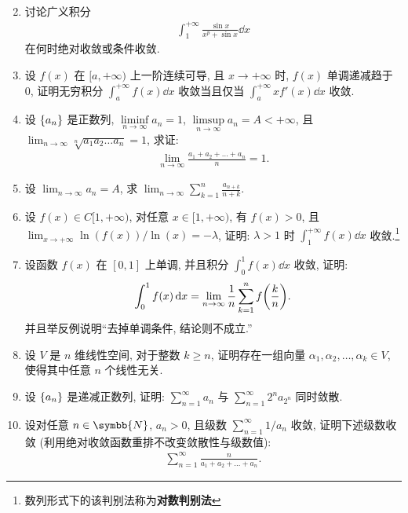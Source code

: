 \documentclass{ctexart}
\let\set\qty
\let\emph\textbf
\let\ge\geqslant
\newcommand{\limit}[2]{\lim_{#1 \to #2}}
\newcommand{\N}{\ensuremath{\symbb{N}}}
\begin{document}
\begin{enumerate}[series=exer]
\begin{align*}
    \end{align*}
    \item 讨论广义积分
    \begin{align*}
        \int_{1}^{+\infty} \frac{\sin x}{x^{p} + \sin x} \dd{x}
    \end{align*}
    在何时绝对收敛或条件收敛.
    \item 设 $ f(x) $ 在 $ [a, +\infty) $ 上一阶连续可导, 且 $ x \to +\infty $ 时, $ f(x) $ 单调递减趋于 $ 0 $, 证明无穷积分 $ \int_{a}^{+\infty} f(x) \dd{x} $ 收敛当且仅当 $ \int_{a}^{+\infty} xf'(x) \dd{x} $ 收敛. 
    \item 设 $ \set{a_{n}} $ 是正数列, $ \liminf\limits_{n\to\infty} a_{n} = 1 $, $ \limsup\limits_{n\to\infty} a_{n} = A < +\infty $, 且 $ \limit{n}{\infty} \sqrt[n]{a_{1}a_{2}\dots a_{n}} = 1 $, 求证:
    \begin{align*}
        \limit{n}{\infty}\frac{a_{1} + a_{2} + \dots + a_{n}}{n} = 1.
    \end{align*}
    \item 设 $ \limit{n}{\infty} a_{n} = A $, 求 $ \limit{n}{\infty} \sum_{k=1}^{n} \frac{a_{n+k}}{n+k} $.  
    \item 设 $ f(x) \in C[1, +\infty) $, 对任意 $ x\in [1, +\infty) $, 有 $ f(x) > 0 $, 且 $ \limit{x}{+\infty} \ln(f(x))/\ln(x) = -\lambda $, 证明: $ \lambda > 1 $ 时 $ \int_{1}^{+\infty} f(x) \dd{x} $ 收敛.\footnote{数列形式下的该判别法称为\emph{对数判别法}}
    \item 设函数 $ f(x) $ 在 $ [0, 1] $ 上单调, 并且积分 $ \int_{0}^{1} f(x) \dd{x} $ 收敛, 证明:
    \begin{align*}
        \int_{0}^{1} f(x) \dd{x} = \limit{n}{\infty} \frac{1}{n} \sum_{k=1}^{n} f\qty(\frac{k}{n}).
    \end{align*}
    并且举反例说明``去掉单调条件, 结论则不成立.''
    \item 设 $ V $ 是 $ n $ 维线性空间, 对于整数 $ k \ge n $, 证明存在一组向量 $ \alpha_{1}, \alpha_{2}, \dots, \alpha_{k} \in V $, 使得其中任意 $ n $ 个线性无关.
    \item 设 $ \set{a_{n}} $ 是递减正数列, 证明: $ \sum_{n=1}^{\infty}a_{n} $ 与 $ \sum_{n=1}^{\infty}2^{n}a_{2^{n}} $ 同时敛散.
    \item 设对任意 $ n\in \N $, $ a_{n} > 0 $, 且级数 $ \sum_{n=1}^{\infty}1/a_{n} $ 收敛, 证明下述级数收敛 (利用绝对收敛函数重排不改变敛散性与级数值):
    \begin{align*}
        \sum_{n=1}^{\infty}\frac{n}{a_{1} + a_{2} + \dots + a_{n}}.
    \end{align*}

\end{enumerate}
\end{document}
